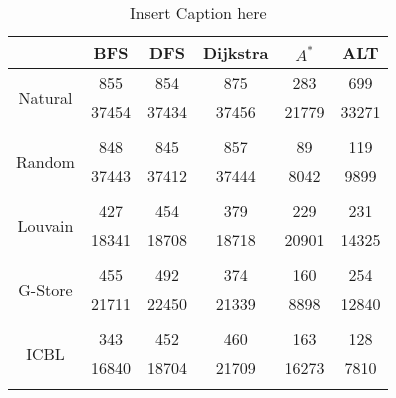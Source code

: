 \begin{table}
	\begin{center}
		 \begin{tabular}[c]{c c c c c c} \toprule
			  & BFS & DFS & Dijkstra & $A^*$  & ALT \\ \midrule 
 			\multirow{2}{*}{Natural}  & 855 & 854 & 875 & 283 & 699 \\ 
 				 & 37454 & 37434 & 37456 & 21779 & 33271 \\ 
 				&&&&& \\[-0.5em]
 			\multirow{2}{*}{Random}  & 848 & 845 & 857 & 89 & 119 \\ 
 				 & 37443 & 37412 & 37444 & 8042 & 9899 \\ 
 				&&&&& \\[-0.5em]
 			\multirow{2}{*}{Louvain}  & 427 & 454 & 379 & 229 & 231 \\ 
 				 & 18341 & 18708 & 18718 & 20901 & 14325 \\ 
 				&&&&& \\[-0.5em]
 			\multirow{2}{*}{G-Store}  & 455 & 492 & 374 & 160 & 254 \\ 
 				 & 21711 & 22450 & 21339 & 8898 & 12840 \\ 
 				&&&&& \\[-0.5em]
 			\multirow{2}{*}{ICBL}  & 343 & 452 & 460 & 163 & 128 \\ 
 				 & 16840 & 18704 & 21709 & 16273 & 7810 \\ 
 				&&&&& \\[-0.5em]
 					\end{tabular}  
  	 \end{center}
	 \caption{ Insert Caption here}
\end{table}